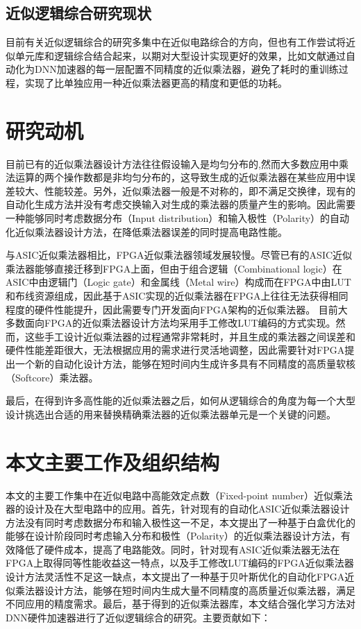 
\subsection{近似逻辑综合研究现状}

目前有关近似逻辑综合的研究多集中在近似电路综合的方向\cite{AC:ALS:ALSRAC}，但也有工作尝试将近似单元库和逻辑综合结合起来，以期对大型设计实现更好的效果，比如文献\cite{Accelerator:ALWANN}通过自动化为DNN加速器的每一层配置不同精度的近似乘法器，避免了耗时的重训练过程，实现了比单独应用一种近似乘法器更高的精度和更低的功耗。



\section{研究动机}


目前已有的近似乘法器设计方法往往假设输入是均匀分布的,然而大多数应用中乘法运算的两个操作数都是非均匀分布的，这导致生成的近似乘法器在某些应用中误差较大、性能较差。另外，近似乘法器一般是不对称的，即不满足交换律，现有的自动化生成方法并没有考虑交换输入对生成的乘法器的质量产生的影响。因此需要一种能够同时考虑数据分布（Input distribution）和输入极性（Polarity）的自动化近似乘法器设计方法，在降低乘法器误差的同时提高电路性能。

与ASIC近似乘法器相比，FPGA近似乘法器领域发展较慢。尽管已有的ASIC近似乘法器能够直接迁移到FPGA上面，但由于组合逻辑（Combinational logic）在ASIC中由逻辑门（Logic gate）和金属线（Metal wire）构成而在FPGA中由LUT和布线资源组成，因此基于ASIC实现的近似乘法器在FPGA上往往无法获得相同程度的硬件性能提升，因此需要专门开发面向FPGA架构的近似乘法器。
目前大多数面向FPGA的近似乘法器设计方法均采用手工修改LUT编码的方式实现。然而，这些手工设计近似乘法器的过程通常非常耗时，并且生成的乘法器之间误差和硬件性能差距很大，无法根据应用的需求进行灵活地调整，因此需要针对FPGA提出一个新的自动化设计方法，能够在短时间内生成许多具有不同精度的高质量软核（Softcore）乘法器。

最后，在得到许多高性能的近似乘法器之后，如何从逻辑综合的角度为每一个大型设计挑选出合适的用来替换精确乘法器的近似乘法器单元是一个关键的问题。


\section{本文主要工作及组织结构}

本文的主要工作集中在近似电路中高能效定点数（Fixed-point number）近似乘法器的设计及在大型电路中的应用。首先，针对现有的自动化ASIC近似乘法器设计方法没有同时考虑数据分布和输入极性这一不足，本文提出了一种基于白盒优化的能够在设计阶段同时考虑输入分布和极性（Polarity）的近似乘法器设计方法，有效降低了硬件成本，提高了电路能效。同时，针对现有ASIC近似乘法器无法在FPGA上取得同等性能收益这一特点，以及手工修改LUT编码的FPGA近似乘法器设计方法灵活性不足这一缺点，本文提出了一种基于贝叶斯优化的自动化FPGA近似乘法器设计方法，能够在短时间内生成大量不同精度的高质量近似乘法器，满足不同应用的精度需求。最后，基于得到的近似乘法器库，本文结合强化学习方法对DNN硬件加速器进行了近似逻辑综合的研究。主要贡献如下：

